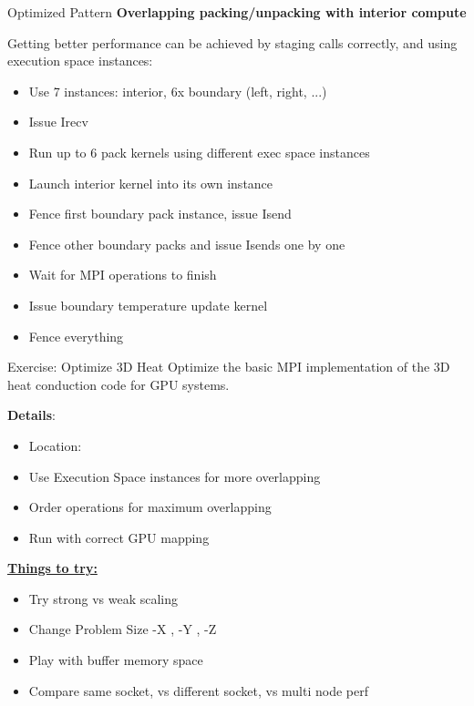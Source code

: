 \begin{frame}{Optimized Pattern}
\textbf{Overlapping packing/unpacking with interior compute}

Getting better performance can be achieved by staging calls correctly, and using execution space instances:

\begin{itemize}
  \item Use 7 instances: interior, 6x boundary (left, right, ...)
  \item Issue Irecv
  \item Run up to 6 pack kernels using different exec space instances
  \item Launch interior kernel into its own instance
  \item Fence first boundary pack instance, issue Isend
  \item Fence other boundary packs and issue Isends one by one
  \item Wait for MPI operations to finish
  \item Issue boundary temperature update kernel
  \item Fence everything
\end{itemize}
\end{frame}

\begin{frame}[fragile]{Exercise: Optimize 3D Heat}
Optimize the basic MPI implementation of the 3D heat conduction code for GPU systems.

  \vspace{10pt}

  \textbf{Details}:
  \begin{small}
  \begin{itemize}
\item Location: 
\item Use Execution Space instances for more overlapping
\item Order operations for maximum overlapping
\item Run with correct GPU mapping
\end{itemize}
  \end{small}

\ul{\textbf{Things to try:}}
  \begin{small}
  \begin{itemize}
  \item Try strong vs weak scaling
  \item Change Problem Size -X , -Y , -Z
  \item Play with buffer memory space
  \item Compare same socket, vs different socket, vs multi node perf
  \end{itemize}
  \end{small}
\end{frame}

